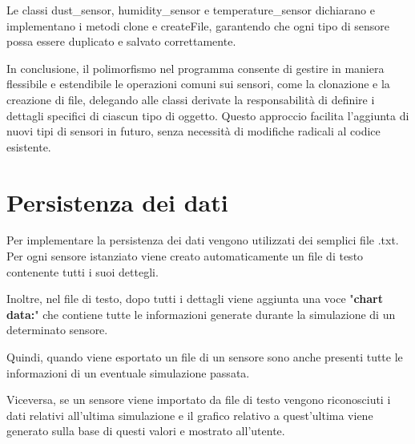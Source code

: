 \documentclass{article}
\begin{document}
    \noindent Le classi dust\_sensor, humidity\_sensor e temperature\_sensor dichiarano e implementano i metodi clone e createFile, garantendo che ogni tipo di sensore possa essere duplicato e salvato correttamente.


    In conclusione, il polimorfismo nel programma consente di gestire in maniera flessibile e estendibile le operazioni comuni sui sensori, come la clonazione e la creazione di file, delegando alle classi derivate la responsabilità di definire i dettagli specifici di ciascun tipo di oggetto.   Questo approccio facilita l'aggiunta di nuovi tipi di sensori in futuro, senza necessità di modifiche radicali al codice esistente.

    \section{Persistenza dei dati}
    Per implementare la persistenza dei dati vengono utilizzati dei semplici file .txt.
    Per ogni sensore istanziato viene creato automaticamente un file di testo contenente tutti i suoi dettegli. 

    \noindent Inoltre, nel file di testo, dopo tutti i dettagli viene aggiunta una voce "\textbf{chart data:}" che contiene tutte le informazioni generate durante la simulazione di un determinato sensore.

    \noindent Quindi, quando viene esportato un file di un sensore sono anche presenti tutte le informazioni di un eventuale simulazione passata.

    \noindent Viceversa, se un sensore viene importato da file di testo vengono riconosciuti i dati relativi all’ultima simulazione e il grafico relativo a quest’ultima viene generato sulla base di questi valori e mostrato all’utente.
\end{document}
